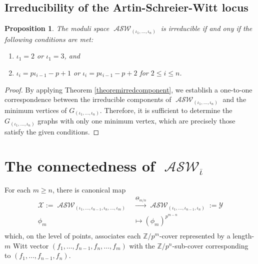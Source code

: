 \documentclass{compositio}
\newtheorem{proposition}[theorem]{Proposition}
\theoremstyle{remark}
\theoremstyle{remark}
\DeclareMathOperator{\ASW}{\mathcal{ASW}}
\begin{document}
\subsection{Irreducibility of the Artin-Schreier-Witt locus}

\begin{proposition}
The moduli space $\ASW_{(\iota_1, \ldots, \iota_n)}$ is irreducible if and ony if the following conditions are met:
\begin{enumerate}[label*=\arabic*.]
    \item $\iota_1=2$ or $\iota_1=3$, and
    \item $\iota_{i}=p\iota_{i-1}-p+1$ or $\iota_{i}=p\iota_{i-1}-p+2$ for $2 \le i \le n$.
\end{enumerate}
\end{proposition}

\begin{proof}
By applying Theorem \ref{theoremirredcomponent}, we establish a one-to-one correspondence between the irreducible components of $\ASW_{({\iota_1, \ldots, \iota_n})}$ and the minimum vertices of $G_{({\iota_1, \ldots, \iota_n})}$. Therefore, it is sufficient to determine the $G_{({\iota_1, \ldots, \iota_n})}$ graphs with only one minimum vertex, which are precisely those satisfy the given conditions.
\end{proof}

\section{The connectedness of \texorpdfstring{$\ASW_{\overline{\iota}}$}{}}
\label{secconnectedness}



For each $m\ge n$, there is canonical map
\begin{equation*}
\begin{split}
     \mathscr{X}:= \ASW_{(\iota_1, \ldots, \iota_{n-1}, \iota_n, \ldots, \iota_m)} & \xrightarrow{\Theta_{m/n}} \ASW_{(\iota_1, \ldots, 
     \iota_{n-1}, \iota_n)}:=\mathscr{Y}\\
    \phi_m & \longmapsto{} (\phi_m)^{p^{m-n}}  \\
\end{split}
\end{equation*}
which, on the level of points, associates each $\mathbb{Z}/p^m$-cover represented by a length-$m$ Witt vector $(f_1, \ldots, f_{n-1},\allowbreak f_n, \ldots, f_m)$ with the $\mathbb{Z}/p^n$-sub-cover corresponding to $(f_1, \ldots, f_{n-1},\allowbreak f_n)$.
\end{document}
